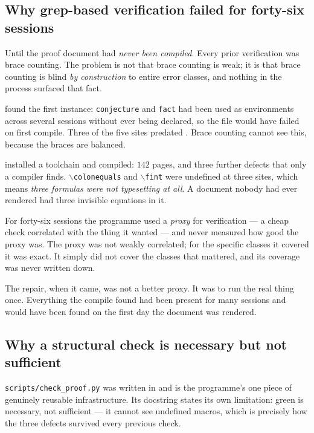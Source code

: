 \subsection{Why grep-based verification failed for forty-six sessions}

Until  the proof document had \emph{never been compiled}. Every prior
verification was brace counting. The problem is not that brace counting is
weak; it is that brace counting is blind \emph{by construction} to entire
error classes, and nothing in the process surfaced that fact.

 found the first instance: \texttt{conjecture} and \texttt{fact} had
been used as environments across several sessions without ever being declared,
so the file would have failed on first compile. Three of the five sites
predated . Brace counting cannot see this, because the braces are
balanced.

 installed a toolchain and compiled: \(142\) pages, and three further
defects that only a compiler finds. \(\backslash\)\texttt{colonequals} and
\(\backslash\)\texttt{fint} were undefined at three sites, which means
\emph{three formulas were not typesetting at all}. A document nobody had ever
rendered had three invisible equations in it.

\begin{obsv}
\label{obs:proxy-verification}
For forty-six sessions the programme used a \emph{proxy} for verification ---
a cheap check correlated with the thing it wanted --- and never measured how
good the proxy was. The proxy was not weakly correlated; for the specific
classes it covered it was exact. It simply did not cover the classes that
mattered, and its coverage was never written down.

\smallskip
The repair, when it came, was not a better proxy. It was to run the real
thing once. Everything the compile found had been present for many sessions
and would have been found on the first day the document was rendered.
\end{obsv}

\subsection{Why a structural check is necessary but not sufficient}

\texttt{scripts/check\_proof.py} was written in  and is the programme's
one piece of genuinely reusable infrastructure. Its docstring states its own
limitation: green is necessary, not sufficient --- it cannot see undefined
macros, which is precisely how the three  defects survived every
previous check.

